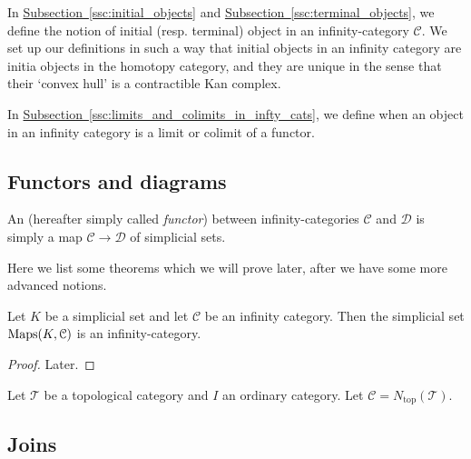 \documentclass[main.tex]{subfiles}
\begin{document}
In \hyperref[ssc:initial_objects]{Subsection~\ref*{ssc:initial_objects}} and \hyperref[ssc:terminal_objects]{Subsection~\ref*{ssc:terminal_objects}}, we define the notion of initial (resp. terminal) object in an infinity-category $\mathcal{C}$. We set up our definitions in such a way that initial objects in an infinity category are initia objects in the homotopy category, and they are unique in the sense that their `convex hull' is a contractible Kan complex.

In \hyperref[ssc:limits_and_colimits_in_infty_cats]{Subsection~\ref*{ssc:limits_and_colimits_in_infty_cats}}, we define when an object in an infinity category is a limit or colimit of a functor.

\subsection{Functors and diagrams}
\label{ssc:functors_and_diagrams}

\begin{definition}
  \label{def:infinity_functor}
  An  (hereafter simply called \emph{functor}) between infinity-categories $\mathcal{C}$ and $\mathcal{D}$ is simply a map $\mathcal{C} \to \mathcal{D}$ of simplicial sets.
\end{definition}

Here we list some theorems which we will prove later, after we have some more advanced notions.

\begin{proposition}
  Let $K$ be a simplicial set and let $\mathcal{C}$ be an infinity category. Then the simplicial set $\operatorname{Maps}(K, \mathcal{C})$ is an infinity-category.
\end{proposition}
\begin{proof}
  Later.
\end{proof}

\begin{definition}
  \label{def:homotopy_coherent_diagram}
  Let $\mathcal{T}$ be a topological category and $I$ an ordinary category. Let $\mathcal{C} = N_{\mathrm{top}}(\mathcal{T})$.
\end{definition}

\subsection{Joins}
\label{ssc:joins}
\end{document}
